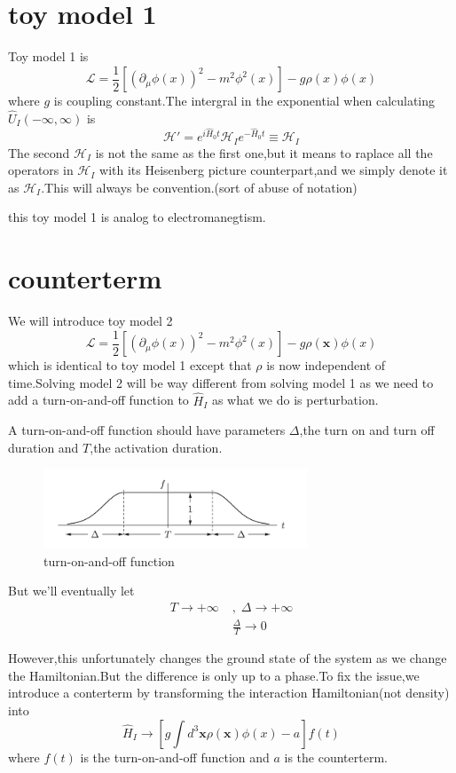 \documentclass[a4paper]{article}
\begin{document}
\section{toy model 1}
Toy model 1 is$$\mathscr{L}=\frac{1}{2}[(\partial_\mu\phi(x))^2-m^2\phi^2(x)]-g\rho(x)\phi(x)$$where $g$ is coupling constant.The intergral in the exponential when calculating $\hat{U}_I(-\infty,\infty)$ is $$\mathscr{H}'=e^{i\hat{H}_0t}\mathscr{H}_Ie^{-\hat{H}_0t}\equiv\mathscr{H}_I$$
The second $\mathscr{H}_I$ is not the same as the first one,but it means to raplace all the operators in $\mathscr{H}_I$ with its Heisenberg picture counterpart,and we simply denote it as $\mathscr{H}_I$.This will always be convention.(sort of abuse of notation)
\par this toy model 1 is analog to electromanegtism.
\section{counterterm}
We will introduce toy model 2$$\mathscr{L}=\frac{1}{2}[(\partial_\mu\phi(x))^2-m^2\phi^2(x)]-g\rho(\bm{x})\phi(x)$$which is identical to toy model 1 except that $\rho$ is now independent of time.Solving model 2 will be way different from solving model 1 as we need to add a turn-on-and-off function to $\hat{H}_I$ as what we do is perturbation.
\par A turn-on-and-off function should have parameters $\Delta$,the turn on and turn off duration and $T$,the activation duration.
\begin{figure}[htbp]
	\centering
	\includegraphics[width=0.7\textwidth]{3.png}
	\caption{turn-on-and-off function}
	\label{fig:label}
\end{figure}
But we'll eventually let
\begin{align*}
	T\rightarrow+\infty\;&,\;\Delta\rightarrow+\infty\\
	&\frac{\Delta}{T}\rightarrow 0
\end{align*}
\par However,this unfortunately changes the ground state of the system as we change the Hamiltonian.But the difference is only up to a phase.To fix the issue,we introduce a conterterm by transforming the interaction Hamiltonian(not density) into$$\hat{H}_I\rightarrow[g\int d^3\bm{x}\rho(\bm{x})\phi(x)-a]f(t)$$where $f(t)$ is the turn-on-and-off function and $a$ is the counterterm.
\end{document}
